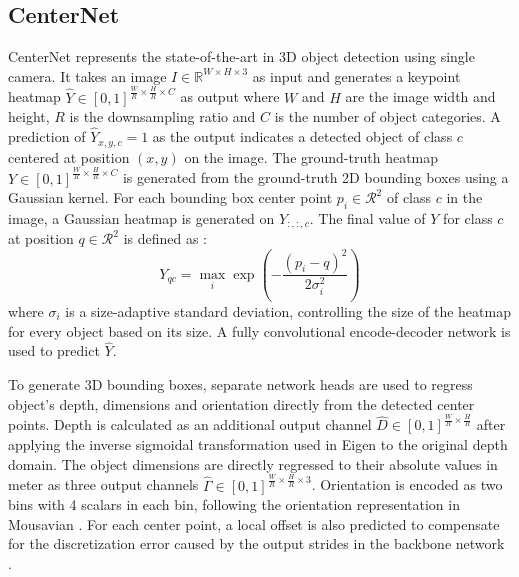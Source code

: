 \documentclass[10pt,twocolumn,letterpaper]{article}
\begin{document}
   \subsection{CenterNet}
   CenterNet \cite{zhou2019objects} represents the state-of-the-art in 3D object detection using single camera. It takes an image $I \in \mathbb{R}^{W \times H \times 3}$ as input and 
   generates a keypoint heatmap $\hat{Y} \in [0,1]^{\frac{W}{R} \times \frac{H}{R} \times C}$
   as output where $W$ and $H$ are the image width and height, $R$ is the 
   downsampling ratio and $C$ is the number of object categories. A prediction of 
   $\hat{Y}_{x,y,c} = 1$ as the output indicates a detected object of class $c$ 
   centered at position $(x,y)$ on the image. 
   The ground-truth heatmap $Y \in [0,1]^{\frac{W}{R} \times \frac{H}{R} \times C}$ 
   is generated from the ground-truth 2D bounding boxes using a Gaussian kernel. 
   For each bounding box center point $p_i \in \mathcal{R}^2$ of class $c$ in the 
   image, a Gaussian heatmap is generated on $Y_{:,:,c}$. The final value of 
   $Y$ for class $c$ at position $q \in \mathcal{R}^2$ is defined as 
   \cite{zhou2019objects}:\useshortskip
   \begin{equation}
       \label{eq1}
       Y_{qc} = \max_{i} \exp(-\frac{(p_{i}-q)^2}{2\sigma_{i}^2})
   \end{equation}
   where $\sigma_i$ is a size-adaptive standard deviation, controlling the size 
   of the heatmap for every object based on its size.
   A fully convolutional encode-decoder network is used to predict $\hat{Y}$.
   
   To generate 3D bounding boxes, separate network heads are used to regress 
   object's depth, dimensions and orientation directly from the detected center 
   points. Depth is calculated as an additional output channel 
   $\hat{D}\in [0,1]^{\frac{W}{R} \times \frac{H}{R}}$ after applying the inverse 
   sigmoidal transformation used in Eigen \etal \cite{eigen2014depth} to the 
   original depth domain. The object dimensions are directly regressed to their 
   absolute values in meter as three output channels 
   $\hat{\Gamma}\in [0,1]^{\frac{W}{R} \times \frac{H}{R}\times 3}$. Orientation is 
   encoded as two bins with 4 scalars in each bin, following the orientation 
   representation in Mousavian \etal \cite{mousavian20173d}. For each center point, a 
   local offset is also predicted to compensate for the discretization error 
   caused by the output strides in the backbone network \cite{zhou2019objects}.
   
\end{document}
